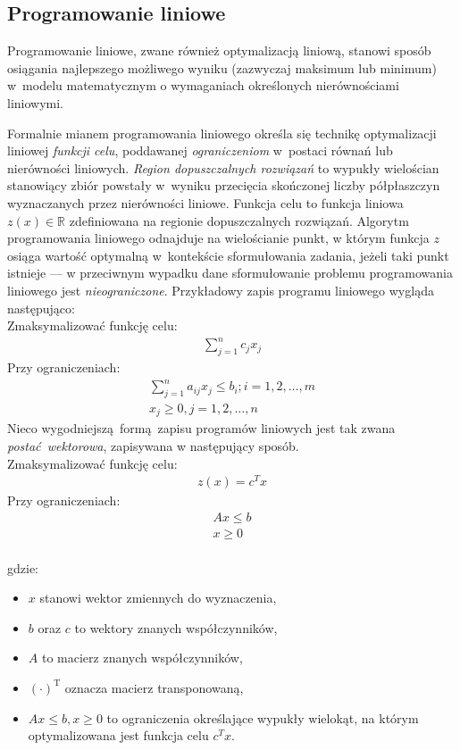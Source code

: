 \subsection{Programowanie liniowe}\label{ss_lp}
\par{
  Programowanie liniowe, zwane również optymalizacją liniową, stanowi sposób
  osiągania najlepszego możliwego wyniku (zazwyczaj maksimum lub minimum) w~modelu 
  matematycznym o wymaganiach określonych nierównościami liniowymi.
}
\par{
  Formalnie mianem programowania liniowego określa się technikę optymalizacji liniowej \emph{funkcji celu}, poddawanej \emph{ograniczeniom} w~postaci równań lub nierówności liniowych.
  \emph{Region dopuszczalnych rozwiązań} to wypukły wielościan stanowiący zbiór powstały w~wyniku przecięcia skończonej liczby półpłaszczyn wyznaczanych przez nierówności liniowe.
  Funkcja celu to funkcja liniowa $z(x) \in \mathbb{R}$ zdefiniowana na regionie dopuszczalnych rozwiązań.
  Algorytm programowania liniowego odnajduje na wielościanie punkt, w którym funkcja $z$ osiąga wartość optymalną w~kontekście sformułowania zadania, jeżeli taki punkt istnieje --- w przeciwnym wypadku dane sformułowanie problemu programowania liniowego jest \emph{nieograniczone}.
  Przykładowy zapis programu liniowego wygląda następująco:\\
  Zmaksymalizować funkcję celu:
  \begin{align*}
    \sum_{j=1}^{n} c_j x_j
  \end{align*}
  Przy ograniczeniach: \begin{align*}
    \sum_{j=1}^{n}a_{ij}x_j \leq b_i; i =1, 2, \ldots, m\\
    x_j \geq 0, j=1, 2, \ldots, n
  \end{align*}
  Nieco wygodniejszą~formą zapisu programów liniowych jest tak zwana \emph{postać~wektorowa}, zapisywana w następujący sposób.\\
  Zmaksymalizować funkcję celu:
  \begin{align*}
    z(x)={c^T}x
  \end{align*}
  Przy ograniczeniach: \begin{align*}
    Ax \leq b\\
    x\geq 0
  \end{align*}\\
  gdzie:
  \begin{itemize}
    \item $x$ stanowi wektor zmiennych do wyznaczenia,
    \item $b$ oraz $c$ to wektory znanych współczynników,
    \item $A$ to macierz znanych współczynników,
    \item ${(\cdot)}^\mathrm{T}$ oznacza macierz transponowaną,
    \item $Ax \leq b, x\geq 0$ to ograniczenia określające wypukły wielokąt,
      na którym optymalizowana jest funkcja celu $c^{T}x$.
  \end{itemize}
}
